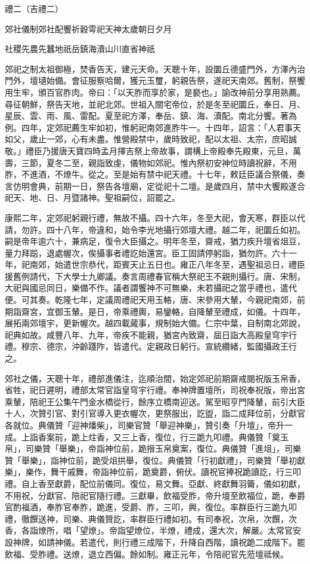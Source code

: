 
\begin{pinyinscope}
禮二（吉禮二）

郊社儀制郊社配饗祈穀雩祀天神太歲朝日夕月

社稷先農先蠶地祇岳鎮海瀆山川直省神祇

郊祀之制太祖御極，焚香告天，建元天命。天聰十年，設圜丘德盛門外，方澤內治門外，壇壝始備。會征服察哈爾，獲元玉璽，躬親告祭，遂祀天南郊。舊制，祭饗用生牢，頒百官胙肉。帝曰：「以天胙而享於家，是褻也。」諭改神前分享用熟薦。尋征朝鮮，祭告天地，並祀北郊。世祖入關宅帝位，於是冬至祀圜丘，奉日、月、星辰、雲、雨、風、雷配。夏至祀方澤，奉岳、鎮、海、瀆配。南北分饗。著為例。四年，定郊祀薦生牢如初，惟躬祀南郊進胙牛一。十四年，詔言：「人君事天如父，歲止一郊，心有未盡。惟營殿禁中，歲時致祀，配以太祖、太宗，庶昭誠敬。」禮臣乃援唐天寶四時孟月擇吉祭上帝故事，謂構上帝殿奉先殿東，元旦，萬壽，三節，夏冬二至，親詣致虔，儀物如郊祀。惟內祭初安神位時讀祝辭，不用胙，不進酒，不燎牛。從之。至是始有禁中祀天禮。十七年，敕廷臣議合祭儀，奏言仿明會典，前期一日，祭告各壇廟，定從祀十二壇。是歲四月，禁中大饗殿遂合祀天、地、日、月暨諸神。聖祖嗣位，詔罷之。

康熙二年，定郊祀躬親行禮，無故不攝。四十六年，冬至大祀，會天寒，群臣以代請，勿許。四十八年，帝違和，始令李光地攝行郊壇大禮。越二年，祀圜丘如初。嗣是帝年逾六十，兼病足，復令大臣攝之。明年冬至，齋戒，猶力疾升壇省俎豆，量力拜跽，退處幄次，俟攝事者禮訖始還宮。臣工固請停躬詣，猶勿許。六十一年，祀南郊，始遣世宗恭代，距賓天止五日也。雍正八年冬至，遇聖祖忌日，禮臣援舊例請代，下大學士九卿議。奏言周禮春官稱大祭祀王不親則攝行。唐、宋制，大祀與國忌同日，樂備不作。議者謂饗神不可無樂，未若攝祀之當乎禮也，遣代便。可其奏。乾隆七年，定議周禮祀天用玉輅，唐、宋參用大輦，今親祀南郊，前期詣齋宮，宜御玉輦。是日，帝乘禮輿，易鑾輅，自降輦至禮成，如儀。十四年，展拓兩郊壇宇，更新幄次。越四載蕆事，規制始大備。仁宗中葉，自制南北郊說，祀典如故。咸豐八年、九年，帝疾不能親，猶宮內致齋，屆日詣大高殿皇穹宇行禮。穆宗、德宗，沖齡踐阼，皆遣代。定親政日躬行。宣統纘緒，監國攝政王行之。

郊社之儀，天聰十年，禮部進儀注，迄順治間，始定郊祀前期齋戒閱祝版玉帛香，省牲，祀日遲明，禮部太常官詣皇穹宇行禮。奉神牌置壇所，司祝奉祝版，帝出宮乘輦，陪祀王公集午門金水橋從行，餘序立橋南迎送。駕至昭亨門降輦，前引大臣十人，次贊引官、對引官導入更衣幄次，更祭服出，訖盥，詣二成拜位前，分獻官各就位。典儀贊「迎神燔柴」，司樂官贊「舉迎神樂」，贊引奏「升壇」，帝升一成。上詣香案前，跪上炷香，又三上香，復位，行三跪九叩禮。典儀贊「奠玉帛」，司樂贊「舉樂」，帝詣神位前，跪搢玉帛奠案，復位。典儀贊「進俎」，司樂贊「舉樂」，詣神位前，跪受俎拱舉，復位。典儀贊「行初獻禮」，司樂贊「舉初獻樂」，樂作，舞干戚舞，帝詣神位前，跪奠爵，俯伏。讀祝官捧祝跪讀訖，行三叩禮。自上香至獻爵，配位前儀同。復位，易文舞。亞獻、終獻舞羽籥，儀如初獻，不用祝，分獻官、陪祀官隨行禮。三獻畢，飲福受胙，帝升壇至飲福位，跪，奉爵官酌福酒，奉胙官奉胙，跪進，受爵、胙，三叩，興，復位。率群臣行三跪九叩禮，徹饌送神，司樂、典儀贊訖，率群臣行禮如初。有司奉祝，次帛，次饌，次香，各詣燎所，唱「望燎」。帝詣望燎位，半燎，禮成，還大次，解嚴。太常官安設神牌，如請神儀。若遣代，則行禮三成階下，升降自西階，讀祝跪二成階下。罷飲福、受胙禮。送燎，退立西偏。餘如制。雍正元年，令陪祀官先蒞壇祗候。


\end{pinyinscope}
